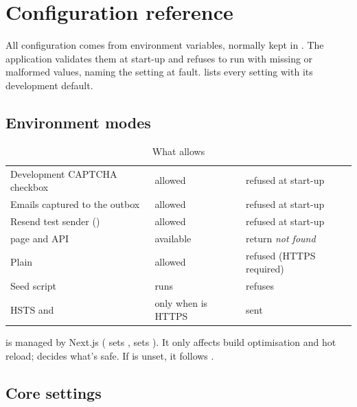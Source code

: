 \chapter{Configuration reference}
\label{ch:config}

All configuration comes from environment variables, normally kept in . The application validates them at start-up and refuses to run with missing or malformed values, naming the setting at fault.  lists every setting with its development default.

\section{Environment modes}
\label{sec:appenv}

\begin{table}[H]
\centering\small
\caption{What  allows}\label{tab:appenv}
\begin{tabularx}{\linewidth}{@{}L{4.6cm}L{2.7cm}Y@{}}
\toprule
{} &  &  \\
\midrule
Development CAPTCHA checkbox & allowed & refused at start-up \\
Emails captured to the outbox & allowed & refused at start-up \\
Resend test sender () & allowed & refused at start-up \\
 page and API & available & return \emph{not found} \\
Plain   & allowed & refused (HTTPS required) \\
Seed script & runs & refuses \\
HSTS and  & only when  is HTTPS & sent \\
\bottomrule
\end{tabularx}
\end{table}

 is managed by Next.js ( sets ,  sets ). It only affects build optimisation and hot reload;  decides what's safe. If  is unset, it follows .

\section{Core settings}

